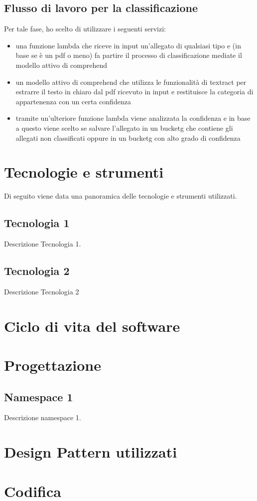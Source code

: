 \subsection{Flusso di lavoro per la classificazione}
\label{subsec:classificazione}
Per tale fase, ho scelto di utilizzare i seguenti servizi:
\begin{itemize}
    \item una funzione lambda che riceve in input un'allegato di qualsiasi tipo e (in base se è un pdf o meno) fa partire il processo di classificazione mediate il modello attivo di comprehend
    \item un modello attivo di comprehend che utilizza le funzionalità di textract per estrarre il testo in chiaro dal pdf ricevuto in input e restituisce la categoria di appartenenza con un certa confidenza
    \item tramite un'ulteriore funzione lambda viene analizzata la confidenza e in base a questo viene scelto se salvare l'allegato in un \gls{bucketg} che contiene gli allegati non classificati oppure in un \gls{bucketg} con alto grado di confidenza
\end{itemize}
\section{Tecnologie e strumenti}
\label{sec:tecnologie-strumenti}

Di seguito viene data una panoramica delle tecnologie e strumenti utilizzati.

\subsection*{Tecnologia 1}
Descrizione Tecnologia 1.

\subsection*{Tecnologia 2}
Descrizione Tecnologia 2

\section{Ciclo di vita del software}
\label{sec:ciclo-vita-software}

\section{Progettazione}
\label{sec:progettazione}

\subsection{Namespace 1} %
Descrizione namespace 1.

\begin{namespacedesc}
\end{namespacedesc}


\section{Design Pattern utilizzati}

\section{Codifica}
